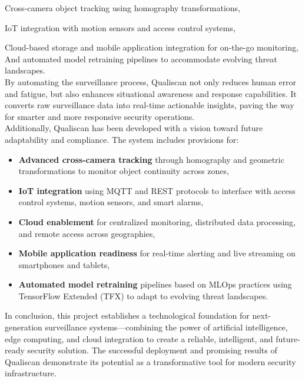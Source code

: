\documentclass[12pt]{report}
\begin{document}
{Cross-camera object tracking using homography transformations,

IoT integration with motion sensors and access control systems,

Cloud-based storage and mobile application integration for on-the-go monitoring,\\

And automated model retraining pipelines to accommodate evolving threat landscapes.\\

By automating the surveillance process, Qualiscan not only reduces human error and fatigue, but also enhances situational awareness and response capabilities. It converts raw surveillance data into real-time actionable insights, paving the way for smarter and more responsive security operations.\\

Additionally, Qualiscan has been developed with a vision toward future adaptability and compliance. The system includes provisions for:

\begin{itemize}
    \item \textbf{Advanced cross-camera tracking} through homography and geometric transformations to monitor object continuity across zones,
    \item \textbf{IoT integration} using MQTT and REST protocols to interface with access control systems, motion sensors, and smart alarms,
    \item \textbf{Cloud enablement} for centralized monitoring, distributed data processing, and remote access across geographies,
    \item \textbf{Mobile application readiness} for real-time alerting and live streaming on smartphones and tablets,
    \item \textbf{Automated model retraining} pipelines based on MLOps practices using TensorFlow Extended (TFX) to adapt to evolving threat landscapes.
\end{itemize}

In conclusion, this project establishes a technological foundation for next-generation surveillance systems—combining the power of artificial intelligence, edge computing, and cloud integration to create a reliable, intelligent, and future-ready security solution. The successful deployment and promising results of Qualiscan demonstrate its potential as a transformative tool for modern security infrastructure.
\par}
\end{document}
